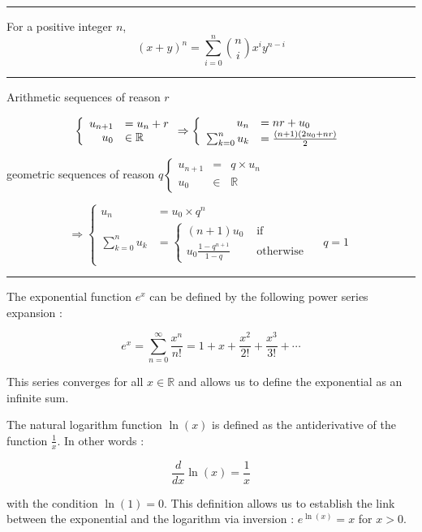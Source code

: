 \hrule
\begin{f}
	
	For a positive integer \(n\),
	\[
	(x+y)^n=\sum_{i=0}^n\binom{n}{i} x^i y^{n-i}
	\]
	
\end{f}
\hrule
\begin{f}[Sequences]  
	
	Arithmetic sequences of reason \(r\)
	
	\[
	\left\{\begin{array} { r l } 
		{ u _ { n + 1 } } & { = u _ { n } + r } \\
		{ u _ { 0 } } & { \in \mathbb { R } }
	\end{array} \Rightarrow \left\{\begin{array}{rl}
		u_n & =n r+u_0 \\
		\sum_{k=0}^n u_k & =\frac{(n+1)\left(2 u_0+n r\right)}{2}
	\end{array}\right.\right.
	\]
	
	geometric sequences of reason \(q\left\{\begin{array}{rll}u_{n+1} & = & q \times u_n \\ u_0 & \in & \mathbb{R}\end{array}\right.\)
	
	\[
	\Rightarrow\left\{\begin{array}{rlr}
		u_n & =u_0 \times q^n \\
		\sum_{k=0}^n u_k & =\left\{\begin{array}{rl}
			(n+1) u_0 & \text { if } \\
			u_0 \frac{1-q^{n+1}}{1-q} & \text { otherwise }
		\end{array} \quad q=1\right.
	\end{array}\right.
	\]
	
\end{f}
\hrule
\begin{f}
	The exponential function \( e^x \) can be defined by the following power series expansion :
	
	\[
	e^x = \sum_{n=0}^{\infty} \frac{x^n}{n!} = 1 + x + \frac{x^2}{2!} + \frac{x^3}{3!} + \cdots
	\]
	
	This series converges for all \( x \in \mathbb{R} \) and allows us to define the exponential as an infinite sum.
	
	
	The natural logarithm function \( \ln(x) \) is defined as the antiderivative of the function \( \frac{1}{x} \). In other words :
	
	\[
	\frac{d}{dx} \ln(x) = \frac{1}{x}
	\]
	
	with the condition \( \ln(1) = 0 \). This definition allows us to establish the link between the exponential and the logarithm via inversion : \( e^{\ln(x)} = x \) for \( x > 0 \).
	
\end{f}



